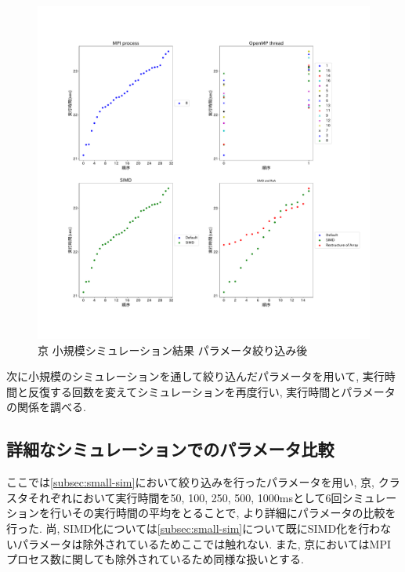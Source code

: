 \begin{figure}[htb]
\begin{center}
    \includegraphics[width=14cm]{./images/k-bench-adjusted-final.pdf}
    \caption{京 小規模シミュレーション結果 パラメータ絞り込み後}
    \label{fig:k-bench-adjusted-final}
\end{center}
\end{figure}
\clearpage
次に小規模のシミュレーションを通して絞り込んだパラメータを用いて,
実行時間と反復する回数を変えてシミュレーションを再度行い,
実行時間とパラメータの関係を調べる.\\

\subsection{詳細なシミュレーションでのパラメータ比較}
\label{subsec:detail-sim}
ここでは\ref{subsec:small-sim}において絞り込みを行ったパラメータを用い,
京, クラスタそれぞれにおいて実行時間を50, 100, 250, 500, 1000msとして6回シミュレーションを行いその実行時間の平均をとることで,
より詳細にパラメータの比較を行った.
尚, SIMD化については\ref{subsec:small-sim}について既にSIMD化を行わないパラメータは除外されているためここでは触れない.
また, 京においてはMPIプロセス数に関しても除外されているため同様な扱いとする.\\


